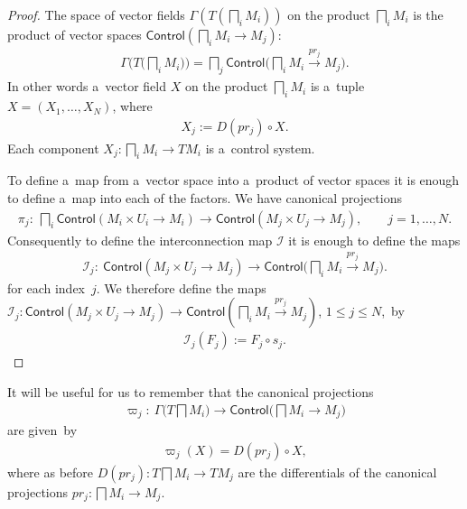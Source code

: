 \documentclass[10pt,a4paper]{amsart}
\numberwithin{equation}{section}
\begin{document}
\begin{proof}
The space of vector f\/ields $\Gamma \left(T\left(\bigsqcap_i M_i\right)\right)$ on the product $\bigsqcap_i M_i$ is the product of vector
spaces $\mathsf{Control} (\bigsqcap_i M_i \to M_j)$:
\begin{gather*}
\Gamma \bigg(T\bigg(\bigsqcap_i M_i\bigg)\bigg) = \bigsqcap_j \mathsf{Control} \bigg(\bigsqcap_i M_i \xrightarrow{pr_j}M_j\bigg).
\end{gather*}
In other words a~vector f\/ield $X $ on the product $\bigsqcap_i M_i$ is a~tuple $X = (X_1, \ldots, X_N)$, where
\begin{gather*}
X_j:= D (pr_j)\circ X.
\end{gather*}
Each component $X_j \colon \bigsqcap_i M_i \to TM_i$ is a~control system.

To def\/ine a~map from a~vector space into a~product of vector spaces it is enough to def\/ine a~map into each of the factors.
We have canonical projections
\begin{gather*}
\pi_j\colon \ \bigsqcap_i \mathsf{Control}(M_i\times U_i \to M_i) \to \mathsf{Control}(M_j\times U_j\to M_j),
\qquad
j=1,\ldots, N.
\end{gather*}
Consequently to def\/ine the interconnection map $\mathscr{I}$ it is enough to def\/ine the maps
\begin{gather*}
\mathscr{I}_j\colon \ \mathsf{Control}(M_j\times U_j\to M_j) \to \mathsf{Control} \bigg(\bigsqcap_i M_i \xrightarrow {pr_j}M_j\bigg).
\end{gather*}
for each index~$j$.
We therefore def\/ine the maps $\mathscr{I}_j\colon \mathsf{Control}(M_j\times U_j\to M_j) \to \mathsf{Control}
(\bigsqcap_i M_i \xrightarrow {pr_j} M_j)$, $1\leq j\leq N$,~by
\begin{gather*}
\mathscr{I}_j (F_j):= F_j \circ s_j. \tag*{\qed}
\end{gather*}
\renewcommand{\qed}{}
\end{proof}

\begin{Remark}
\label{rmrk:2.21}
It will be useful for us to remember that the canonical projections
\begin{gather*}
\varpi_j\colon \ \Gamma \Big(T\bigsqcap M_i\Big)
\to \mathsf{Control} \Big(\bigsqcap M_i \to M_j\Big)
\end{gather*}
are given~by
\begin{gather*}
\varpi_j (X) = D (pr_j)\circ X,
\end{gather*}
where as before $D (pr_j)\colon T \bigsqcap M_i \to TM_j$ are the dif\/ferentials of the canonical projections $pr_j\colon\bigsqcap M_i \to M_j$.
\end{Remark}
\end{document}
